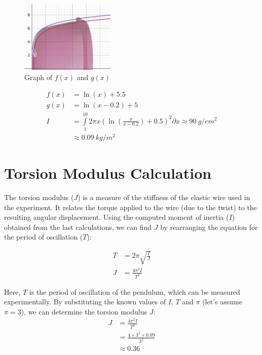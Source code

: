 \begin{center}
    \begin{figure}
        \centering
        \includegraphics[width=0.4\textwidth]{assets/graph.png}
        \caption{Graph of $f(x)$ and $g(x)$}       
    \end{figure}
\end{center}

\begin{align*}
    f(x) &= \ln(x) + 5.5 \\
    g(x) &= \ln(x - 0.2)  + 5 \\
    I &= \int\limits_{1}^{10} 2\pi x {\left(\ln\left(\frac{x}{x-0.2}\right) + 0.5\right)}^2\partial{x} \approx 90~g/cm^2 \\
    &\approx 0.09~kg/m^2
\end{align*}

\section{Torsion Modulus Calculation}

The torsion modulus ($J$) is a measure of the stiffness of the elastic wire used in the experiment. It relates the torque applied to the wire (due to the twist) to the resulting angular displacement. Using the computed moment of inertia ($I$) obtained from the last calculations, we can find $J$ by rearranging the equation for the period of oscillation ($T$):

\begin{align*}
    T &= 2\pi\sqrt{\frac{I}{J}} \\
    J &= \frac{4\pi^2I}{T^2}
\end{align*}

\newpage
\thispagestyle{plain}

\noindent Here, $T$ is the period of oscillation of the pendulum, which can be measured experimentally. By substituting the known values of $I$, $T$ and $\pi$ (let's assume $\pi = 3$), we can determine the torsion modulus $J$:
\begin{align*}
    J &= \frac{4\pi^2I}{T^2} \\
    &= \frac{4 \times 3^2 \times 0.09}{3^2} \\
    &\approx 0.36
\end{align*}


